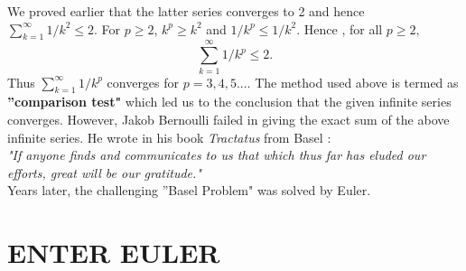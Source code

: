 \documentclass[a4paper,reqno,11pt]{book}
\theoremstyle{plain}%
\theoremstyle{definition}
\begin{document}
We proved earlier that the latter series converges to 2 and hence\\
$\sum_{k=1}^{\infty}1/k^2 \leq 2.$ For $p \geq 2$, $k^p \geq k^2$ and $1/k^p \leq 1/k^2.$ Hence , for all $p \geq 2,$\\
$$\sum_{k=1}^{\infty}1/k^p \leq 2.$$
Thus $\sum_{k=1}^{\infty}1/k^p$ converges for $p=3,4,5....$
The method used above is termed as \textbf{''comparison test"} which led us to the conclusion that the given infinite series converges.
However, Jakob Bernoulli failed in giving the exact sum of the above infinite series. He wrote in his book \textit{Tractatus} from Basel :\\
\indent \textit{"If anyone finds and communicates to us that which thus far has eluded our efforts, great will be our gratitude."}\\
Years later, the challenging ''Basel Problem" was solved by Euler.\\
\section*{ENTER EULER}
\end{document}
